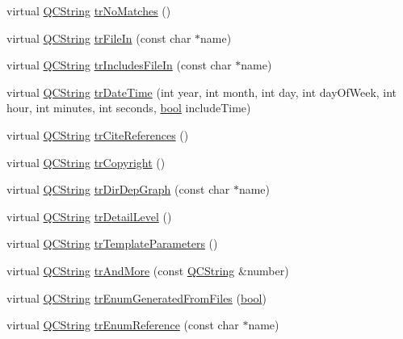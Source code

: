 \begin{DoxyCompactItemize}
\item 
virtual \hyperlink{class_q_c_string}{Q\+C\+String} \hyperlink{class_translator_japanese_a67dcb66cf4ac9376069a6064100b3e0e}{tr\+No\+Matches} ()
\item 
virtual \hyperlink{class_q_c_string}{Q\+C\+String} \hyperlink{class_translator_japanese_a0b4f3f23c0d955ab3d49639a0781d429}{tr\+File\+In} (const char $\ast$name)
\item 
virtual \hyperlink{class_q_c_string}{Q\+C\+String} \hyperlink{class_translator_japanese_afa05a22f2cb6629b86c326b0fe56a3ac}{tr\+Includes\+File\+In} (const char $\ast$name)
\item 
virtual \hyperlink{class_q_c_string}{Q\+C\+String} \hyperlink{class_translator_japanese_a6be353f75bc39756320621241ee4f385}{tr\+Date\+Time} (int year, int month, int day, int day\+Of\+Week, int hour, int minutes, int seconds, \hyperlink{qglobal_8h_a1062901a7428fdd9c7f180f5e01ea056}{bool} include\+Time)
\item 
virtual \hyperlink{class_q_c_string}{Q\+C\+String} \hyperlink{class_translator_japanese_ad2d0fd23566c18aaefedc6f154072401}{tr\+Cite\+References} ()
\item 
virtual \hyperlink{class_q_c_string}{Q\+C\+String} \hyperlink{class_translator_japanese_a1d736d77bc42bc6cc37db2f620ff9121}{tr\+Copyright} ()
\item 
virtual \hyperlink{class_q_c_string}{Q\+C\+String} \hyperlink{class_translator_japanese_a00e1b37754ca0a80039aa712b4ba1118}{tr\+Dir\+Dep\+Graph} (const char $\ast$name)
\item 
virtual \hyperlink{class_q_c_string}{Q\+C\+String} \hyperlink{class_translator_japanese_a2777a4ec6aa939b008cbd34b9b084729}{tr\+Detail\+Level} ()
\item 
virtual \hyperlink{class_q_c_string}{Q\+C\+String} \hyperlink{class_translator_japanese_ad7d2c82a4ab7f02e45460179ec188464}{tr\+Template\+Parameters} ()
\item 
virtual \hyperlink{class_q_c_string}{Q\+C\+String} \hyperlink{class_translator_japanese_a54f7d9f13f719d351d583befbcfad9c2}{tr\+And\+More} (const \hyperlink{class_q_c_string}{Q\+C\+String} \&number)
\item 
virtual \hyperlink{class_q_c_string}{Q\+C\+String} \hyperlink{class_translator_japanese_a9a2691028093ed98f8ecb5b16e5903f7}{tr\+Enum\+Generated\+From\+Files} (\hyperlink{qglobal_8h_a1062901a7428fdd9c7f180f5e01ea056}{bool})
\item 
virtual \hyperlink{class_q_c_string}{Q\+C\+String} \hyperlink{class_translator_japanese_a13eadac95c15f7cf42442940a0d5f944}{tr\+Enum\+Reference} (const char $\ast$name)

\end{DoxyCompactItemize}
